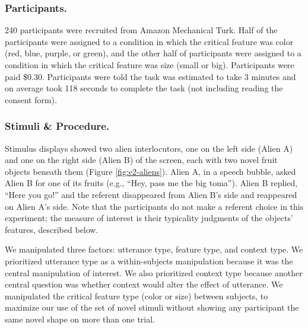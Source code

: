\documentclass{ucetd}
\begin{document}
\hypertarget{participants.}{%
\subsubsection{Participants.}\label{participants.}}

240 participants were recruited from Amazon Mechanical Turk. Half of the
participants were assigned to a condition in which the critical feature
was color (red, blue, purple, or green), and the other half of
participants were assigned to a condition in which the critical feature
was size (small or big). Participants were paid \$0.30. Participants
were told the task was estimated to take 3 minutes and on average took
118 seconds to complete the task (not including reading the consent
form).

\hypertarget{stimuli-procedure.}{%
\subsubsection{Stimuli \& Procedure.}\label{stimuli-procedure.}}

Stimulus displays showed two alien interlocutors, one on the left side
(Alien A) and one on the right side (Alien B) of the screen, each with
two novel fruit objects beneath them (Figure \ref{fig:e2-aliens}). Alien
A, in a speech bubble, asked Alien B for one of its fruits (e.g., ``Hey,
pass me the big toma''). Alien B replied, ``Here you go!'' and the
referent disappeared from Alien B's side and reappeared on Alien A's
side. Note that the participants do not make a referent choice in this
experiment; the measure of interest is their typicality judgments of the
objects' features, described below.

We manipulated three factors: utterance type, feature type, and context
type. We prioritized utterance type as a within-subjects manipulation
because it was the central manipulation of interest. We also prioritized
context type because another central question was whether context would
alter the effect of utterance. We manipulated the critical feature type
(color or size) between subjects, to maximize our use of the set of
novel stimuli without showing any participant the same novel shape on
more than one trial.
\end{document}
